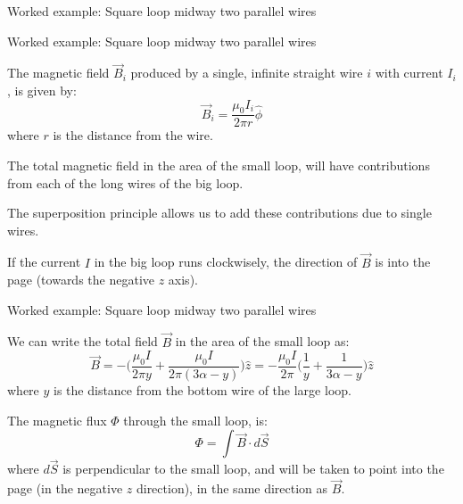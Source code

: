 {\begin{frame}{Worked example: Square loop midway two parallel wires}
 \end{frame}


 \begin{frame}{Worked example: Square loop midway two parallel wires}

   The magnetic field $\vec{B}_{i}$ produced by a single,
   infinite straight wire $i$ with current $I_i$, is given by:
   \begin{equation*}
     \vec{B}_i = \frac{\mu_0 I_i}{2\pi r} \hat{\phi}
   \end{equation*}
   where $r$ is the distance from the wire.\\
   \vspace{0.2cm}

   The total magnetic field in the area of the small loop, will have contributions
   from each of the long wires of the big loop.\\
   \vspace{0.2cm}

   The superposition principle allows
   us to add these contributions due to single wires.\\
   \vspace{0.2cm}

   If the current $I$ in the big loop runs clockwisely,
   the direction of $\vec{B}$ is into the page (towards the negative $z$ axis).\\


\end{frame}

%
%
%

\begin{frame}{Worked example: Square loop midway two parallel wires}

   We can write the total field $\vec{B}$ in the area of the small loop as:
   \begin{equation*}
     \vec{B} = - \Big( \frac{\mu_0 I}{2\pi y} +
                       \frac{\mu_0 I}{2\pi (3\alpha-y)}
                  \Big) \hat{z}
             = - \frac{\mu_0 I}{2\pi}
                 \Big( \frac{1}{y} +
                       \frac{1}{3\alpha-y} \Big) \hat{z}
   \end{equation*}
   where $y$ is the distance from the bottom wire of the large loop.\\
   \vspace{0.2cm}


   The magnetic flux $\Phi$ through the small loop, is:
   \begin{equation*}
     \Phi = \int \vec{B} \cdot d\vec{S}
   \end{equation*}
   where $d\vec{S}$ is perpendicular to the small loop,
   and will be taken to point into the page (in the negative $z$ direction),
   in the same direction as $\vec{B}$.\\
   \vspace{0.2cm}


\end{frame}}
